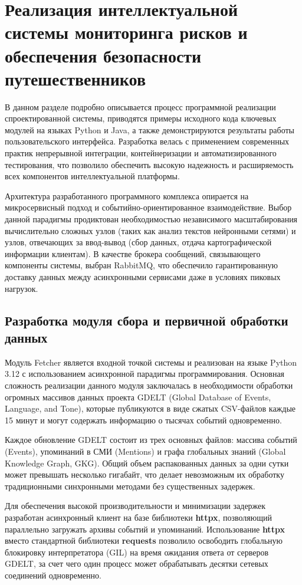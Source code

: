 \section{Реализация интеллектуальной системы мониторинга рисков и обеспечения безопасности путешественников}
\label{sec:development}

В данном разделе подробно описывается процесс программной реализации спроектированной системы, приводятся примеры исходного кода ключевых модулей на языках Python и Java, а также демонстрируются результаты работы пользовательского интерфейса. Разработка велась с применением современных практик непрерывной интеграции, контейнеризации и автоматизированного тестирования, что позволило обеспечить высокую надежность и расширяемость всех компонентов интеллектуальной платформы.

Архитектура разработанного программного комплекса опирается на микросервисный подход и событийно-ориентированное взаимодействие. Выбор данной парадигмы продиктован необходимостью независимого масштабирования вычислительно сложных узлов (таких как анализ текстов нейронными сетями) и узлов, отвечающих за ввод-вывод (сбор данных, отдача картографической информации клиентам). В качестве брокера сообщений, связывающего компоненты системы, выбран RabbitMQ, что обеспечило гарантированную доставку данных между асинхронными сервисами даже в условиях пиковых нагрузок.

\subsection{Разработка модуля сбора и первичной обработки данных}

Модуль Fetcher является входной точкой системы и реализован на языке Python 3.12 с использованием асинхронной парадигмы программирования. Основная сложность реализации данного модуля заключалась в необходимости обработки огромных массивов данных проекта GDELT (Global Database of Events, Language, and Tone), которые публикуются в виде сжатых CSV-файлов каждые 15 минут и могут содержать информацию о тысячах событий одновременно.

Каждое обновление GDELT состоит из трех основных файлов: массива событий (Events), упоминаний в СМИ (Mentions) и графа глобальных знаний (Global Knowledge Graph, GKG). Общий объем распакованных данных за одни сутки может превышать несколько гигабайт, что делает невозможным их обработку традиционными синхронными методами без существенных задержек.

Для обеспечения высокой производительности и минимизации задержек разработан асинхронный клиент на базе библиотеки \textbf{httpx}, позволяющий параллельно загружать архивы событий и упоминаний. Использование \textbf{httpx} вместо стандартной библиотеки \textbf{requests} позволило освободить глобальную блокировку интерпретатора (GIL) на время ожидания ответа от серверов GDELT, за счет чего один процесс может обрабатывать десятки сетевых соединений одновременно.

